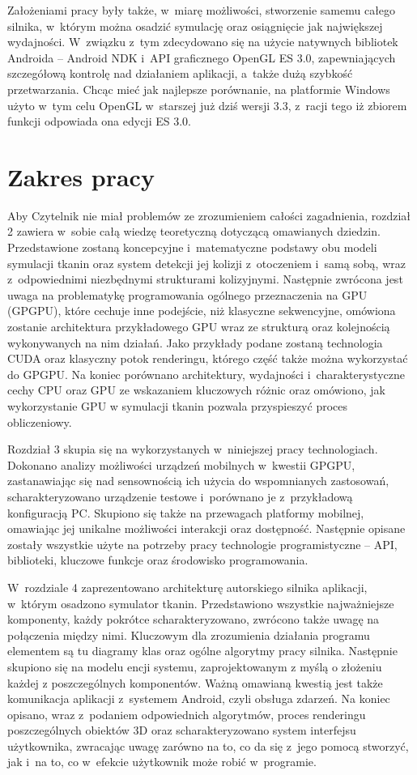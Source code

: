 	Założeniami pracy były także, w~miarę możliwości, stworzenie samemu całego silnika, w~którym można osadzić symulację oraz osiągnięcie jak największej wydajności. W~związku z~tym zdecydowano się na użycie natywnych bibliotek Androida -- Android NDK i~API graficznego OpenGL ES 3.0, zapewniających szczegółową kontrolę nad działaniem aplikacji, a~także dużą szybkość przetwarzania. Chcąc mieć jak najlepsze porównanie, na platformie Windows użyto w~tym celu OpenGL w~starszej już dziś wersji 3.3, z~racji tego iż zbiorem funkcji odpowiada ona edycji ES 3.0.
	
	\section{Zakres pracy}
	\label{t:wprowadzenie:zakres}
	
	Aby Czytelnik nie miał problemów ze zrozumieniem całości zagadnienia, rozdział 2 zawiera w~sobie całą wiedzę teoretyczną dotyczącą omawianych dziedzin. Przedstawione zostaną koncepcyjne i~matematyczne podstawy obu modeli symulacji tkanin oraz system detekcji jej kolizji z~otoczeniem i~samą sobą, wraz z~odpowiednimi niezbędnymi strukturami kolizyjnymi. Następnie zwrócona jest uwaga na problematykę programowania ogólnego przeznaczenia na GPU (GPGPU), które cechuje inne podejście, niż klasyczne sekwencyjne, omówiona zostanie architektura przykładowego GPU wraz ze strukturą oraz kolejnością wykonywanych na nim działań. Jako przykłady podane zostaną technologia CUDA oraz klasyczny potok renderingu, którego część także można wykorzystać do GPGPU. Na koniec porównano architektury, wydajności i~charakterystyczne cechy CPU oraz GPU ze wskazaniem kluczowych różnic oraz omówiono, jak wykorzystanie GPU w symulacji tkanin pozwala przyspieszyć proces obliczeniowy.
	
	Rozdział 3 skupia się na wykorzystanych w~niniejszej pracy technologiach. Dokonano analizy możliwości urządzeń mobilnych w~kwestii GPGPU, zastanawiając się nad sensownością ich użycia do wspomnianych zastosowań, scharakteryzowano urządzenie testowe i~porównano je z~przykładową konfiguracją PC. Skupiono się także na przewagach platformy mobilnej, omawiając jej unikalne możliwości interakcji oraz dostępność. Następnie opisane zostały wszystkie użyte na potrzeby pracy technologie programistyczne -- API, biblioteki, kluczowe funkcje oraz środowisko programowania.
	
	W~rozdziale 4 zaprezentowano architekturę autorskiego silnika aplikacji, w~którym osadzono symulator tkanin. Przedstawiono wszystkie najważniejsze komponenty, każdy pokrótce scharakteryzowano, zwrócono także uwagę na połączenia między nimi. Kluczowym dla zrozumienia działania programu elementem są tu diagramy klas oraz ogólne algorytmy pracy silnika. Następnie skupiono się na modelu encji systemu, zaprojektowanym z myślą o złożeniu każdej z poszczególnych komponentów. Ważną omawianą kwestią jest także komunikacja aplikacji z~systemem Android, czyli obsługa zdarzeń. Na koniec opisano, wraz z~podaniem odpowiednich algorytmów, proces renderingu poszczególnych obiektów 3D oraz scharakteryzowano system interfejsu użytkownika, zwracając uwagę zarówno na to, co da się z~jego pomocą stworzyć, jak i~na to, co w~efekcie użytkownik może robić w~programie.
	
